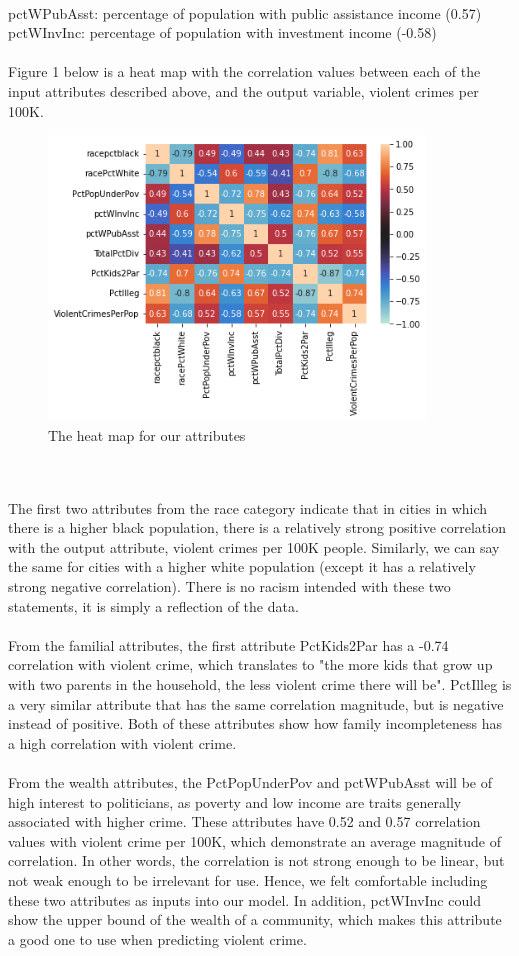 \documentclass[letterpaper, 11 pt, conference]{article}
\begin{document}
\\pctWPubAsst: percentage of population with public assistance income (0.57)
\\pctWInvInc: percentage of population with investment income (-0.58)
\\
\\Figure 1 below is a heat map with the correlation values between each of the input attributes described above, and the output variable, violent crimes per 100K.
\begin{figure}[H]
\centering
\includegraphics[width=10cm]{Heatmap.png}
\caption{The heat map for our attributes}
\label{fig:heatmap}
\end{figure}
\\
\\The first two attributes from the race category indicate that in cities in which there is a higher black population, there is a relatively strong positive correlation with the output attribute, violent crimes per 100K people. Similarly, we can say the same for cities with a higher white population (except it has a relatively strong negative correlation). There is no racism intended with these two statements, it is simply a reflection of the data.
\\
\\From the familial attributes, the first attribute PctKids2Par has a -0.74 correlation with violent crime, which translates to "the more kids that grow up with two parents in the household, the less violent crime there will be". PctIlleg is a very similar attribute that has the same correlation magnitude, but is negative instead of positive. Both of these attributes show how family incompleteness has a high correlation with violent crime.
\\
\\From the wealth attributes, the PctPopUnderPov and pctWPubAsst will be of high interest to politicians, as poverty and low income are traits generally associated with higher crime. These attributes have 0.52 and 0.57 correlation values with violent crime per 100K, which demonstrate an average magnitude of correlation. In other words, the correlation is not strong enough to be linear, but not weak enough to be irrelevant for use. Hence, we felt comfortable including these two attributes as inputs into our model. In addition, pctWInvInc could show the upper bound of the wealth of a community, which makes this attribute a good one to use when predicting violent crime.
\end{document}
